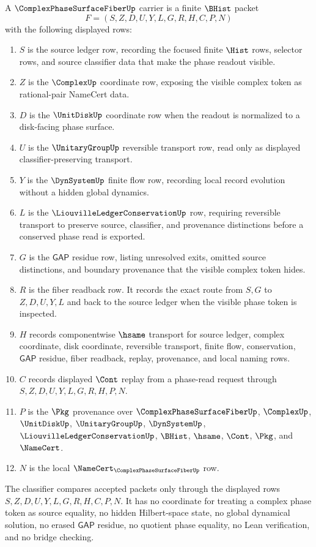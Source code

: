 \begin{definition}
\label{def:complex-phase-surface-fiber-carrier}
A $\ComplexPhaseSurfaceFiberUp$ carrier is a finite $\BHist$ packet
$$
F=(S,Z,D,U,Y,L,G,R,H,C,P,N)
$$
with the following displayed rows:
\begin{enumerate}
\item $S$ is the source ledger row, recording the focused finite $\Hist$ rows, selector rows, and source classifier data that make the phase readout visible.
\item $Z$ is the $\ComplexUp$ coordinate row, exposing the visible complex token as rational-pair NameCert data.
\item $D$ is the $\UnitDiskUp$ coordinate row when the readout is normalized to a disk-facing phase surface.
\item $U$ is the $\UnitaryGroupUp$ reversible transport row, read only as displayed classifier-preserving transport.
\item $Y$ is the $\DynSystemUp$ finite flow row, recording local record evolution without a hidden global dynamics.
\item $L$ is the $\LiouvilleLedgerConservationUp$ row, requiring reversible transport to preserve source, classifier, and provenance distinctions before a conserved phase read is exported.
\item $G$ is the $\mathsf{GAP}$ residue row, listing unresolved exits, omitted source distinctions, and boundary provenance that the visible complex token hides.
\item $R$ is the fiber readback row. It records the exact route from $S,G$ to $Z,D,U,Y,L$ and back to the source ledger when the visible phase token is inspected.
\item $H$ records componentwise $\hsame$ transport for source ledger, complex coordinate, disk coordinate, reversible transport, finite flow, conservation, $\mathsf{GAP}$ residue, fiber readback, replay, provenance, and local naming rows.
\item $C$ records displayed $\Cont$ replay from a phase-read request through $S,Z,D,U,Y,L,G,R,H,P,N$.
\item $P$ is the $\Pkg$ provenance over $\ComplexPhaseSurfaceFiberUp$, $\ComplexUp$, $\UnitDiskUp$, $\UnitaryGroupUp$, $\DynSystemUp$, $\LiouvilleLedgerConservationUp$, $\BHist$, $\hsame$, $\Cont$, $\Pkg$, and $\NameCert$.
\item $N$ is the local $\NameCert_{\ComplexPhaseSurfaceFiberUp}$ row.
\end{enumerate}
The classifier compares accepted packets only through the displayed rows $S,Z,D,U,Y,L,G,R,H,C,P,N$. It has no coordinate for treating a complex phase token as source equality, no hidden Hilbert-space state, no global dynamical solution, no erased $\mathsf{GAP}$ residue, no quotient phase equality, no Lean verification, and no bridge checking.
\end{definition}

